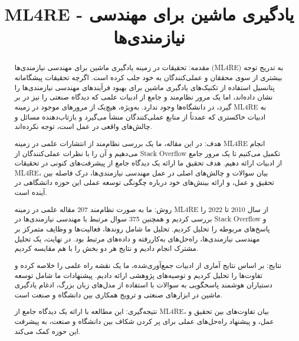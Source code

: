 \documentclass[a4paper,10pt]{article}
\title{ML4RE - یادگیری ماشین برای مهندسی نیازمندی‌ها}
\author{}
\date{}
\begin{document}
    \maketitle


    \begin{abstract}
        
        مقدمه: تحقیقات در زمینه یادگیری ماشین برای مهندسی نیازمندی‌ها (ML4RE) به تدریج توجه بیشتری از سوی محققان و عملی‌کنندگان به خود جلب کرده است. اگرچه تحقیقات پیشگامانه پتانسیل استفاده از تکنیک‌های یادگیری ماشین برای بهبود فرآیندهای مهندسی نیازمندی‌ها را نشان داده‌اند، اما یک مرور نظام‌مند و جامع از ادبیات علمی که دیدگاه صنعتی را نیز در بر گیرد، در دانشگاه‌ها وجود ندارد. به‌ویژه، هیچ‌یک از مرورهای موجود در زمینه ML4RE به ادبیات خاکستری که عمدتاً از منابع عملی‌کنندگان منشأ می‌گیرد و بازتاب‌دهنده مسائل و چالش‌های واقعی در عمل است، توجه نکرده‌اند.

        هدف: در این مقاله، ما یک بررسی نظام‌مند از انتشارات علمی در زمینه ML4RE انجام می‌دهیم و آن را با نظرات عملی‌کنندگان از Stack Overflow تکمیل می‌کنیم تا یک مرور جامع از ادبیات ارائه دهیم. هدف تحقیق ما ارائه یک دیدگاه جامع از پیشرفت‌های کنونی در تحقیقات ML4RE، بیان سوالات و چالش‌های اصلی در عمل مهندسی نیازمندی‌ها، درک فاصله بین تحقیق و عمل، و ارائه بینش‌های خود درباره چگونگی توسعه عملی این حوزه دانشگاهی در آینده است.

        روش: ما به صورت نظام‌مند 207 مقاله علمی در زمینه ML4RE از سال 2010 تا 2022 را بررسی کردیم و همچنین 375 سوال مرتبط با مهندسی نیازمندی‌ها در Stack Overflow و پاسخ‌های مربوطه را تحلیل کردیم. تحلیل ما شامل روندها، فعالیت‌ها و وظایف متمرکز بر مهندسی نیازمندی‌ها، راه‌حل‌های به‌کاررفته و داده‌های مرتبط بود. در نهایت، یک تحلیل مشترک انجام دادیم و نتایج هر دو بخش را با هم مقایسه کردیم.
        
        نتایج: بر اساس نتایج آماری از ادبیات جمع‌آوری‌شده، ما یک نقشه راه علمی را خلاصه کرده و تفاوت‌ها را تحلیل کردیم و توصیه‌های پژوهشی ارائه دادیم. پیشنهادات ما شامل توسعه دستیاران هوشمند پاسخگویی به سوالات با استفاده از مدل‌های زبان بزرگ، ادغام یادگیری ماشین در ابزارهای صنعتی و ترویج همکاری بین دانشگاه و صنعت است.

        نتیجه‌گیری: این مطالعه با ارائه یک دیدگاه جامع از ML4RE، بیان تفاوت‌های بین تحقیق و عمل، و پیشنهاد راه‌حل‌های عملی برای پر کردن شکاف بین دانشگاه و صنعت، به پیشرفت این حوزه کمک می‌کند.

    \end{abstract}

    
\end{document}
